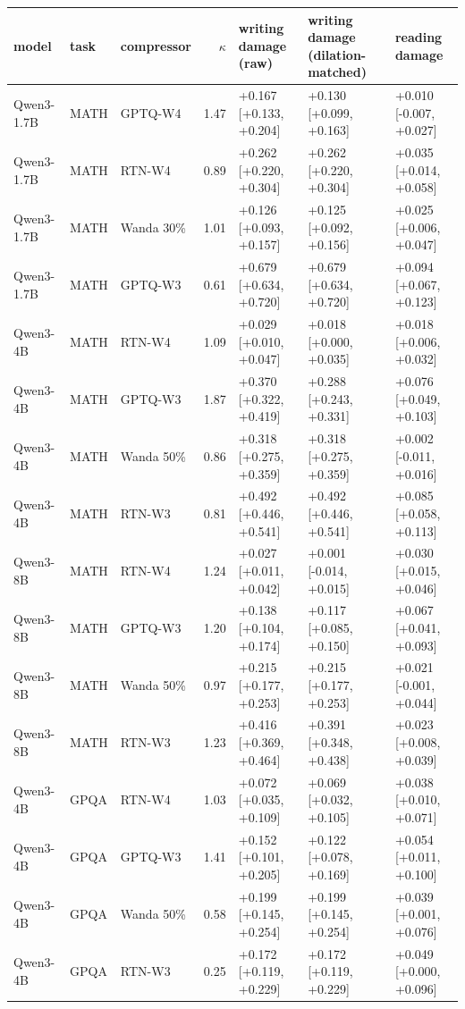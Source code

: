 \begin{tabular}{lllrlll}
\toprule
model & task & compressor & $\kappa$ & writing damage (raw) & writing damage (dilation-matched) & reading damage \\
\midrule
Qwen3-1.7B & MATH & GPTQ-W4 & 1.47 & +0.167 [+0.133, +0.204] & +0.130 [+0.099, +0.163] & +0.010 [-0.007, +0.027] \\
Qwen3-1.7B & MATH & RTN-W4 & 0.89 & +0.262 [+0.220, +0.304] & +0.262 [+0.220, +0.304] & +0.035 [+0.014, +0.058] \\
Qwen3-1.7B & MATH & Wanda 30\% & 1.01 & +0.126 [+0.093, +0.157] & +0.125 [+0.092, +0.156] & +0.025 [+0.006, +0.047] \\
Qwen3-1.7B & MATH & GPTQ-W3 & 0.61 & +0.679 [+0.634, +0.720] & +0.679 [+0.634, +0.720] & +0.094 [+0.067, +0.123] \\
Qwen3-4B & MATH & RTN-W4 & 1.09 & +0.029 [+0.010, +0.047] & +0.018 [+0.000, +0.035] & +0.018 [+0.006, +0.032] \\
Qwen3-4B & MATH & GPTQ-W3 & 1.87 & +0.370 [+0.322, +0.419] & +0.288 [+0.243, +0.331] & +0.076 [+0.049, +0.103] \\
Qwen3-4B & MATH & Wanda 50\% & 0.86 & +0.318 [+0.275, +0.359] & +0.318 [+0.275, +0.359] & +0.002 [-0.011, +0.016] \\
Qwen3-4B & MATH & RTN-W3 & 0.81 & +0.492 [+0.446, +0.541] & +0.492 [+0.446, +0.541] & +0.085 [+0.058, +0.113] \\
Qwen3-8B & MATH & RTN-W4 & 1.24 & +0.027 [+0.011, +0.042] & +0.001 [-0.014, +0.015] & +0.030 [+0.015, +0.046] \\
Qwen3-8B & MATH & GPTQ-W3 & 1.20 & +0.138 [+0.104, +0.174] & +0.117 [+0.085, +0.150] & +0.067 [+0.041, +0.093] \\
Qwen3-8B & MATH & Wanda 50\% & 0.97 & +0.215 [+0.177, +0.253] & +0.215 [+0.177, +0.253] & +0.021 [-0.001, +0.044] \\
Qwen3-8B & MATH & RTN-W3 & 1.23 & +0.416 [+0.369, +0.464] & +0.391 [+0.348, +0.438] & +0.023 [+0.008, +0.039] \\
Qwen3-4B & GPQA & RTN-W4 & 1.03 & +0.072 [+0.035, +0.109] & +0.069 [+0.032, +0.105] & +0.038 [+0.010, +0.071] \\
Qwen3-4B & GPQA & GPTQ-W3 & 1.41 & +0.152 [+0.101, +0.205] & +0.122 [+0.078, +0.169] & +0.054 [+0.011, +0.100] \\
Qwen3-4B & GPQA & Wanda 50\% & 0.58 & +0.199 [+0.145, +0.254] & +0.199 [+0.145, +0.254] & +0.039 [+0.001, +0.076] \\
Qwen3-4B & GPQA & RTN-W3 & 0.25 & +0.172 [+0.119, +0.229] & +0.172 [+0.119, +0.229] & +0.049 [+0.000, +0.096] \\

\end{tabular}
